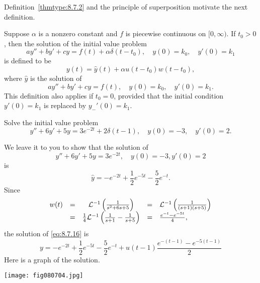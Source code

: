 \documentclass{ximera}
\begin{document}
Definition~\ref{thmtype:8.7.2} and the principle of superposition
motivate the next definition.

\begin{definition}\label{thmtype:8.7.3} Suppose
$\alpha$ is a nonzero constant and
$f$ is
piecewise continuous on $[0,\infty)$.
If $t_0>0$, then the solution of  the  initial value problem
$$
ay''+by'+cy=f(t)+\alpha\delta(t-t_0), \quad  y(0)=k_0,\quad y'(0)=k_1
$$
is defined to be
$$
y(t)=\hat y(t)+\alpha u(t-t_0)w(t-t_0),
$$
where $\hat y$  is the solution of
$$
ay''+by'+cy=f(t), \quad  y(0)=k_0,\quad y'(0)=k_1.
$$
This definition also applies if $t_0=0$, provided that the initial
condition $y'(0)=k_1$ is replaced by $y_-'(0)=k_1$.
\end{definition}

\begin{example}\label{example:8.7.2}
Solve the initial value problem
\begin{equation} \label{eq:8.7.16}
y''+6y'+5y=3e^{-2t}+2\delta(t-1),\quad y(0)=-3,\quad y'(0)=2.
\end{equation}
\begin{explanation}
We leave it to you to show that
the solution of
$$
y''+6y'+5y=3e^{-2t}, \quad    y(0)=-3, y'(0)=2
$$
is
$$
\hat y=-e^{-2t}+\frac{1}{2}e^{-5t}-\frac{5}{2}e^{-t}.
$$
Since
$$
\begin{array}{ccccl}
w(t)&=&{\cal L}^{-1}\left(\frac{1}{s^2+6s+5}\right)&=&
{\cal L}^{-1}\left(\frac{1}{(s+1)(s+5)}\right)\\
&=&\frac{1}{4}{\cal L}^{-1}\left(\frac{1}{s+1}-\frac{1}{s+5}\right)
&=&\frac{e^{-t}-e^{-5t}}{4},
\end{array}
$$
the solution of  \eqref{eq:8.7.16} is
\begin{equation} \label{eq:8.7.17}
y=-e^{-2t}+\frac{1}{2}e^{-5t}-\frac{5}{2}e^{-t}
+u(t-1)\frac{e^{-(t-1)}-e^{-5(t-1)}}{2}
\end{equation}
Here is a graph of the solution.
\begin{image}
 \texttt{[image: fig080704.jpg]}
\end{image}
\end{explanation}
\end{example}

\end{document}

